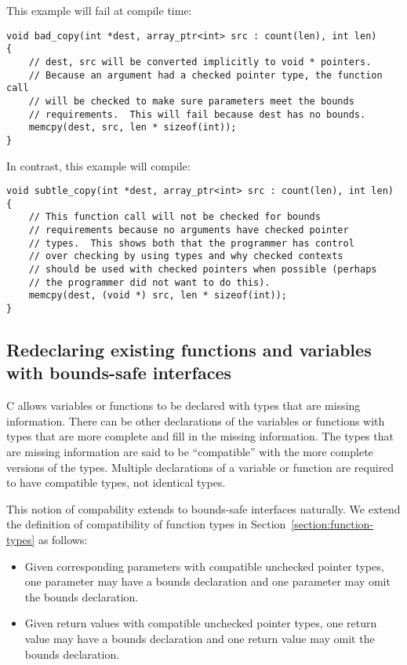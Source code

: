 This example will fail at compile time:
\begin{lstlisting}
void bad_copy(int *dest, array_ptr<int> src : count(len), int len)
{
    // dest, src will be converted implicitly to void * pointers.
    // Because an argument had a checked pointer type, the function call
    // will be checked to make sure parameters meet the bounds
    // requirements.  This will fail because dest has no bounds.
    memcpy(dest, src, len * sizeof(int));
}
\end{lstlisting}

In contrast, this example will compile:
\begin{lstlisting}
void subtle_copy(int *dest, array_ptr<int> src : count(len), int len)
{
    // This function call will not be checked for bounds
    // requirements because no arguments have checked pointer
    // types.  This shows both that the programmer has control
    // over checking by using types and why checked contexts
    // should be used with checked pointers when possible (perhaps
    // the programmer did not want to do this).
    memcpy(dest, (void *) src, len * sizeof(int));
}
\end{lstlisting}

\subsection{Redeclaring existing functions and variables with bounds-safe interfaces}
\label{section:bounds-safe-interface-redeclaration}

C allows variables or functions to be declared with types that are missing information.
There can be other declarations of the variables or functions with types that are more complete
and fill in the missing information.  The types that are missing information are said to be
``compatible'' with the more complete versions of the types.  Multiple declarations of
a variable or function are required to have compatible types, not identical types.

This notion of compability extends to bounds-safe interfaces naturally.  We extend the
definition of compatibility of function types in Section~\ref{section:function-types} as follows:
\begin{itemize}
\item Given corresponding parameters with compatible unchecked pointer types,
one parameter may have a bounds declaration and one parameter may omit the bounds declaration.
\item Given return values with compatible unchecked pointer types, one
return value may have a bounds declaration and one return value may omit the bounds declaration.
\end{itemize}

